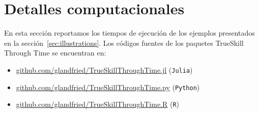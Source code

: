 \documentclass[a4paper,11pt]{book}
\theoremstyle{definition}
\begin{document}
\section{Detalles computacionales}\label{sec:computationDetails}
%
En esta secci\'on reportamos los tiempos de ejecuci\'on de los ejemplos presentados en la secci\'on~\ref{sec:illustrations}.
%
Los c\'odigos fuentes de los paquetes TrueSkill Through Time se encuentran en:
\begin{itemize}
\item \href{github.com/glandfried/TrueSkillThroughTime.jl}{\url{github.com/glandfried/TrueSkillThroughTime.jl}} (\texttt{Julia})
\item \href{github.com/glandfried/TrueSkillThroughTime.py}{\url{github.com/glandfried/TrueSkillThroughTime.py}}  (\texttt{Python})
\item \href{github.com/glandfried/TrueSkillThroughTime.R}{\url{github.com/glandfried/TrueSkillThroughTime.R}}  (\texttt{R})
\end{itemize}

\end{document}
